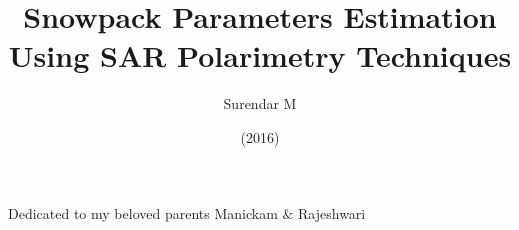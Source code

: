 

\clearpage{}  %



\title{Snowpack Parameters Estimation Using SAR Polarimetry Techniques}
\author{Surendar M}
\date{(2016)}



\reporttype{}



\maketitle
\begin{dedication}
\large{Dedicated to my beloved parents Manickam $\&$ Rajeshwari}
\end{dedication}

